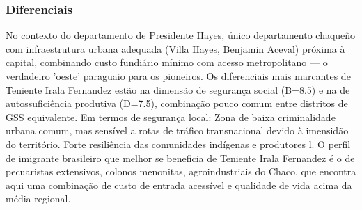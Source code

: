 \subsubsection*{Diferenciais}\label{dif-teniente-irala-fernandez-1509}
No contexto do departamento de Presidente Hayes, único departamento chaqueño com infraestrutura urbana adequada (Villa Hayes, Benjamin Aceval) próxima à capital, combinando custo fundiário mínimo com acesso metropolitano — o verdadeiro 'oeste' paraguaio para os pioneiros. Os diferenciais mais marcantes de Teniente Irala Fernandez estão na dimensão de segurança social (B=8.5) e na de autossuficiência produtiva (D=7.5), combinação pouco comum entre distritos de GSS equivalente. Em termos de segurança local: Zona de baixa criminalidade urbana comum, mas sensível a rotas de tráfico transnacional devido à imensidão do território. Forte resiliência das comunidades indígenas e produtores l. O perfil de imigrante brasileiro que melhor se beneficia de Teniente Irala Fernandez é o de pecuaristas extensivos, colonos menonitas, agroindustriais do Chaco, que encontra aqui uma combinação de custo de entrada acessível e qualidade de vida acima da média regional.
